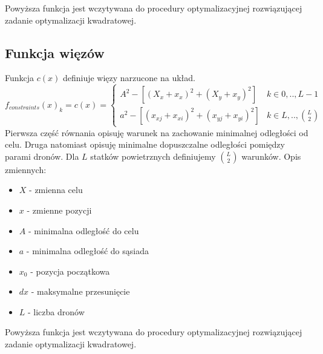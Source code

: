 \documentclass[a4paper, 11pt, oneside]{article}
\begin{document}
Powyższa funkcja jest wczytywana do procedury optymalizacyjnej rozwiązującej zadanie optymalizacji kwadratowej.
\subsection{Funkcja więzów} 
Funkcja $c(x)$ definiuje więzy narzucone na układ.
\[ f_{constraints}(x)_k=c(x)=\begin{cases} 
      A^2-[(X_x+x_x)^2+(X_y+x_y)^2] & k\in{ 0,..,L-1} \\
      a^2-[(x_{xj}+x_{xi})^2+(x_{yj}+x_{yi})^2] & k\in{ L,..,\binom{L}{2}} 
      
   \end{cases}
\]
Pierwsza część równania opisuję warunek na zachowanie minimalnej  odległości od celu. Druga natomiast opisuję minimalne dopuszczalne odległości pomiędzy parami dronów. Dla $L$ statków powietrznych definiujemy $\binom{L}{2}$ warunków.
Opis zmiennych:
\begin{itemize}
\item $X$ - zmienna celu
\item $x$ - zmienne pozycji
\item $A$  - minimalna odległość do celu
\item $a$ -  minimalna odległość do sąsiada
\item $x_0$ - pozycja początkowa
\item $dx$ - maksymalne przesunięcie
\item $L$ - liczba dronów
\end{itemize}
Powyższa funkcja jest wczytywana do procedury optymalizacyjnej rozwiązującej zadanie optymalizacji kwadratowej.
\end{document}
